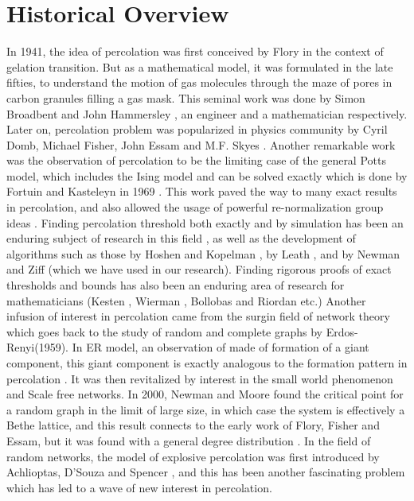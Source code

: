 \section{Historical Overview}
	In 1941, the idea of percolation was first conceived by Flory \cite{Flory1941} in the context of gelation transition. But as a mathematical model, it was formulated in the late fifties, to understand the motion of gas molecules through the maze of pores in carbon granules filling a gas mask. This seminal work was done by Simon Broadbent and John Hammersley \cite{Broadbent1957}, an engineer and a mathematician respectively. Later on, percolation problem was popularized in physics community by Cyril Domb, Michael Fisher, John Essam and M.F. Skyes \cite{Essam1980, Fisher1961}. Another remarkable work was the observation of percolation to be the limiting case of the general Potts model, which includes the Ising model and can be solved exactly which is done by Fortuin and Kasteleyn in 1969 \cite{Kasteleyn1969}. This work paved the way to many exact results in percolation, and also 	allowed the usage of powerful re-normalization group ideas \cite{Cardy1996}. Finding percolation threshold both exactly and by simulation has been an enduring subject of research in	this field \cite{Schrenk2013}, as well as the development of algorithms such as those by Hoshen and	Kopelman \cite{Hoshen1976}, by Leath \cite{Leath1976}, and by Newman and Ziff \cite{Newman2001} (which we have used in	our research). Finding rigorous proofs of exact thresholds and bounds has also been an enduring area of research for mathematicians (Kesten \cite{Kesten1987}, Wierman \cite{Wierman1984}, Bollobas	and Riordan \cite{Bollobs2010} etc.) Another infusion of interest in percolation came from the surgin	field of network theory which goes back to the study of random and complete graphs	by Erdos-Renyi(1959). In ER model, an observation of made of formation of a giant	component, this giant component is exactly analogous to the formation pattern in percolation \cite{Erdos1959, Erdos1964}. It was then revitalized by interest in the small world phenomenon and	Scale free networks. In 2000, Newman and Moore found the critical point for a random	graph in the limit of large size, in which case the system is effectively a Bethe lattice,	and this result connects to the early work of Flory, Fisher and Essam, but it was found
	with a general degree distribution \cite{Moore2000}. In the field of random networks, the model of	explosive percolation was first introduced by Achlioptas, D'Souza and Spencer \cite{Achlioptas2009},	and this has been another fascinating problem which has led to a wave of new interest	in percolation.

